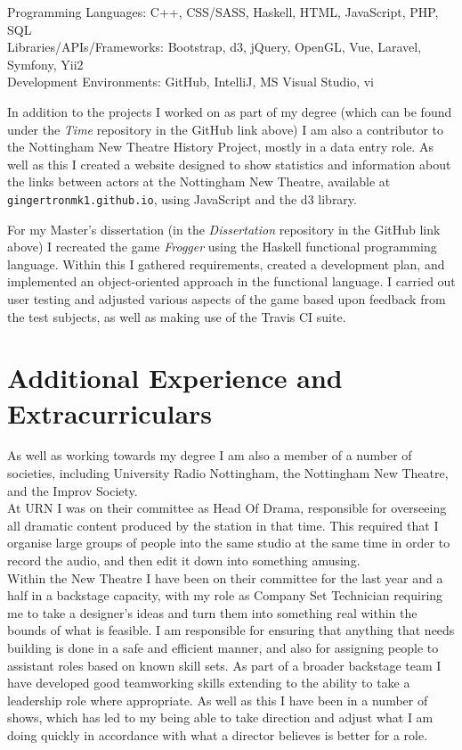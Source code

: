 \documentclass[10pt]{article}
\begin{document}
Programming Languages: C++, CSS/SASS, Haskell, HTML, JavaScript, PHP, SQL\\
Libraries/APIs/Frameworks: Bootstrap, d3, jQuery, OpenGL, Vue, Laravel, Symfony, Yii2\\
Development Environments: GitHub, IntelliJ, MS Visual Studio, vi

\vskip 5mm

In addition to the projects I worked on as part of my degree (which can be found under the \emph{Time} repository in the GitHub link above) I am also a contributor to the Nottingham New Theatre History Project, mostly in a data entry role.
As well as this I created a website designed to show statistics and information about the links between actors at the Nottingham New Theatre, available at \verb|gingertronmk1.github.io|, using JavaScript and the d3 library.

\par

For my Master's dissertation (in the \emph{Dissertation} repository in the GitHub link above) I recreated the game \emph{Frogger} using the Haskell functional programming language.
Within this I gathered requirements, created a development plan, and implemented an object-oriented approach in the functional language.
I carried out user testing and adjusted various aspects of the game based upon feedback from the test subjects, as well as making use of the Travis CI suite.

\section*{Additional Experience and Extracurriculars}

As well as working towards my degree I am also a member of a number of societies, including University Radio Nottingham, the Nottingham New Theatre, and the Improv Society.\\

At URN I was on their committee as Head Of Drama, responsible for overseeing all dramatic content produced by the station in that time.
This required that I organise large groups of people into the same studio at the same time in order to record the audio, and then edit it down into something amusing.\\

Within the New Theatre I have been on their committee for the last year and a half in a backstage capacity, with my role as Company Set Technician requiring me to take a designer's ideas and turn them into something real within the bounds of what is feasible.
I am responsible for ensuring that anything that needs building is done in a safe and efficient manner, and also for assigning people to assistant roles based on known skill sets.
As part of a broader backstage team I have developed good teamworking skills extending to the ability to take a leadership role where appropriate.
As well as this I have been in a number of shows, which has led to my being able to take direction and adjust what I am doing quickly in accordance with what a director believes is better for a role.\\
\end{document}
